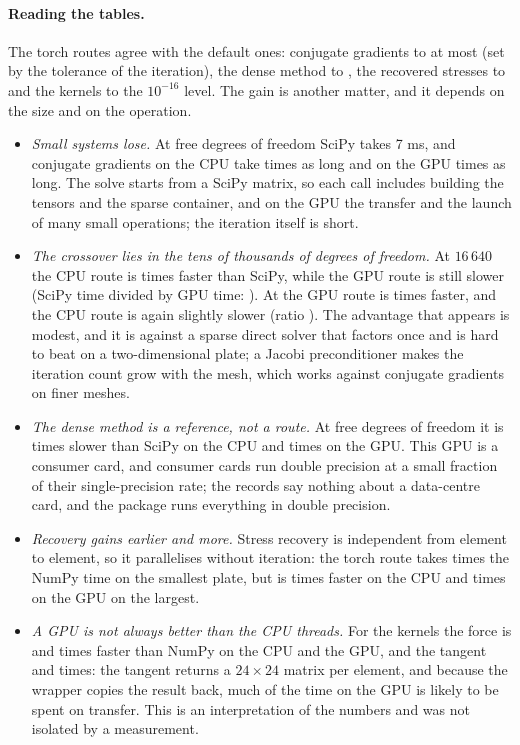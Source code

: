 \paragraph{Reading the tables.} The torch routes agree with the default ones: conjugate gradients to at most \bktCgDiffMax{} (set by the tolerance of the iteration), the dense method to \bktDenseDiffMax, the recovered stresses to \bktStrDiffMax{} and the kernels to the $10^{-16}$ level. The gain is another matter, and it depends on the size and on the operation.
\begin{itemize}
\item \emph{Small systems lose.} At \bktFirstDof{} free degrees of freedom SciPy takes 7 ms, and conjugate gradients on the CPU take \bktSolveSmallCpu{} times as long and on the GPU \bktSolveSmallCuda{} times as long. The solve starts from a SciPy matrix, so each call includes building the tensors and the sparse container, and on the GPU the transfer and the launch of many small operations; the iteration itself is short.
\item \emph{The crossover lies in the tens of thousands of degrees of freedom.} At $16\,640$ the CPU route is \bktSolveMidCpu{} times faster than SciPy, while the GPU route is still slower (SciPy time divided by GPU time: \bktSolveMidCuda). At \bktLastDof{} the GPU route is \bktSolveBigCuda{} times faster, and the CPU route is again slightly slower (ratio \bktSolveBigCpu). The advantage that appears is modest, and it is against a sparse direct solver that factors once and is hard to beat on a two-dimensional plate; a Jacobi preconditioner makes the iteration count grow with the mesh, which works against conjugate gradients on finer meshes.
\item \emph{The dense method is a reference, not a route.} At \bktDenseDof{} free degrees of freedom it is \bktDenseSlow{} times slower than SciPy on the CPU and \bktDenseSlowCuda{} times on the GPU. This GPU is a consumer card, and consumer cards run double precision at a small fraction of their single-precision rate; the records say nothing about a data-centre card, and the package runs everything in double precision.
\item \emph{Recovery gains earlier and more.} Stress recovery is independent from element to element, so it parallelises without iteration: the torch route takes \bktStrSmall{} times the NumPy time on the smallest plate, but is \bktStrBigCpu{} times faster on the CPU and \bktStrBigCuda{} times on the GPU on the largest.
\item \emph{A GPU is not always better than the CPU threads.} For the kernels the force is \bktKfCpu{} and \bktKfCuda{} times faster than NumPy on the CPU and the GPU, and the tangent \bktKtCpu{} and \bktKtCuda{} times: the tangent returns a $24\times24$ matrix per element, and because the wrapper copies the result back, much of the time on the GPU is likely to be spent on transfer. This is an interpretation of the numbers and was not isolated by a measurement.
\end{itemize}
